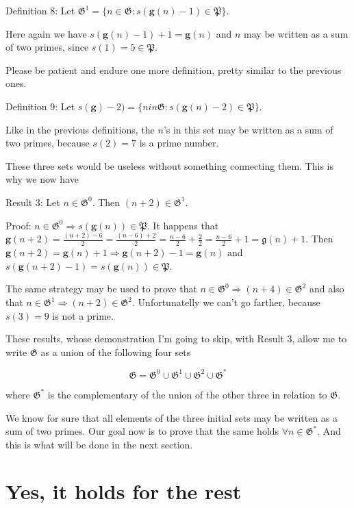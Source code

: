 \documentclass[a4paper,12pt]{article}
\begin{document}
Definition 8: Let $\mathfrak{G}^1 = \{ n \in \mathfrak{G}: s(\mathbf{g}(n) - 1) \in \mathfrak{P} \}$. \newline

Here again we have $s(\mathbf{g}(n) -1) + 1 = \mathbf{g}(n)$ and $n$ may be written as a sum of two primes, since $s(1) = 5 \in \mathfrak{P}$.

Please be patient and endure one more definition, pretty similar to the previous ones. \newline

Definition 9: Let $s(\mathbf{g}) - 2) = \{ n in \mathfrak{G}: s(\mathbf{g}(n) - 2) \in \mathfrak{P} \}$. \newline

Like in the previous definitions, the $n$'s in this set may be written as a sum of two primes, because $s(2) = 7$ is a prime number. \newline

These three sets would be useless without something connecting them. This is why we now have \newline

Result 3: Let $n \in \mathfrak{G}^0$. Then $(n + 2) \in \mathfrak{G}^1$. \newline

Proof: $n \in \mathfrak{G}^0 \Rightarrow s(\mathbf{g}(n)) \in \mathfrak{P}$. It happens that $\mathbf{g}(n + 2) = \frac{(n + 2) - 6}{2} = \frac{(n - 6) + 2}{2} = \frac{n - 6}{2} + \frac{2}{2} = \frac{n - 6}{2} + 1 = \mathfrak{g}(n) + 1$. Then $\mathbf{g}(n+2) = \mathbf{g}(n) + 1 \Rightarrow \mathbf{g}(n+2) - 1 = \mathbf{g}(n)$ and $s(\mathbf{g}(n+2)-1) = s(\mathbf{g}(n)) \in \mathfrak{P}$. \newline

The same strategy may be used to prove that $n \in \mathfrak{G}^0 \Rightarrow (n+4) \in \mathfrak{G}^2$ and also that $n \in \mathfrak{G}^1 \Rightarrow (n+2) \in \mathfrak{G}^2$. Unfortunatelly we can't go farther, because $s(3) = 9$ is not a prime.\newline

These results, whose demonstration I'm going to skip, with Result 3, allow me to write $\mathfrak{G}$ as a union of the following four sets \newline

$$\mathfrak{G} = \mathfrak{G}^0 \cup \mathfrak{G}^1 \cup \mathfrak{G}^2 \cup \mathfrak{G}^*$$ \newline

where $\mathfrak{G}^*$ is the complementary of the union of the other three in relation to $\mathfrak{G}$. \newline

We know for sure that all elements of the three initial sets may be written as a sum of two primes. Our goal now is to prove that the same holds $\forall n \in \mathfrak{G}^*$. And this is what will be done in the next section.

\section{Yes, it holds for the rest}


\tableofcontents
\end{document}
